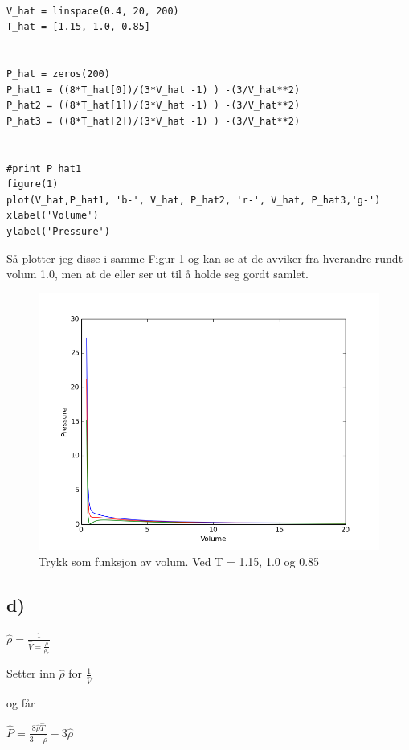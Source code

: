 \documentclass[12pt]{article}
\begin{document}
\begin{lstlisting}

V_hat = linspace(0.4, 20, 200)
T_hat = [1.15, 1.0, 0.85]


P_hat = zeros(200)
P_hat1 = ((8*T_hat[0])/(3*V_hat -1) ) -(3/V_hat**2)
P_hat2 = ((8*T_hat[1])/(3*V_hat -1) ) -(3/V_hat**2)
P_hat3 = ((8*T_hat[2])/(3*V_hat -1) ) -(3/V_hat**2)


#print P_hat1
figure(1)
plot(V_hat,P_hat1, 'b-', V_hat, P_hat2, 'r-', V_hat, P_hat3,'g-')
xlabel('Volume')
ylabel('Pressure')

\end{lstlisting}

Så plotter jeg disse i samme Figur \ref{Fig:volumepressure} og kan se at de avviker fra hverandre rundt volum 1.0, men at de eller ser ut til å holde seg gordt samlet. 

\begin{figure}[ht!] 
\includegraphics[width = \textwidth]{figure_1.png}
\caption{Trykk som funksjon av volum. Ved T = 1.15, 1.0 og 0.85}
\label{Fig:volumepressure}
\end{figure}

\subsection*{d)}

$\hat{\rho} = \frac{1}{\hat{V} = \frac{\rho}{\rho_c}}$

Setter inn $\hat{\rho}$ for $\frac{1}{\hat{V}}$

og får 

$ \hat{P} = \frac{8\hat{\rho}\hat{T}}{3 - \hat{\rho}} - 3\hat{\rho}$
\end{document}
